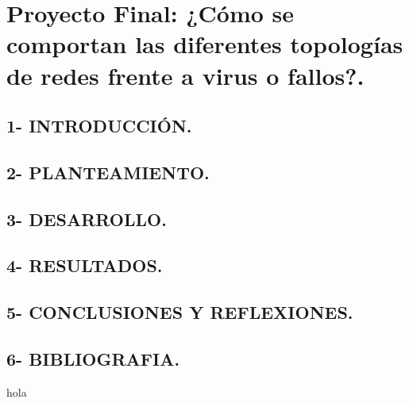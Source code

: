 \documentclass[12pt]{article}
\begin{document}

{\color{red} \section*{Proyecto Final: ¿Cómo se comportan las diferentes topologías de redes frente a virus o fallos?.}}
\vspace{2em}

{\color{blue} \subsection*{1- INTRODUCCIÓN.}}
\vspace{1em}


{\color{blue} \subsection*{2- PLANTEAMIENTO.}}
\vspace{1em}


{\color{blue} \subsection*{3- DESARROLLO.}}
\vspace{1em}

{\color{blue} \subsection*{4- RESULTADOS.}}
\vspace{1em}

{\color{blue} \subsection*{5- CONCLUSIONES Y REFLEXIONES.}}
\vspace{1em}

{\color{blue} \subsection*{6- BIBLIOGRAFIA.}}
\vspace{1em}

hola
\end{document}
